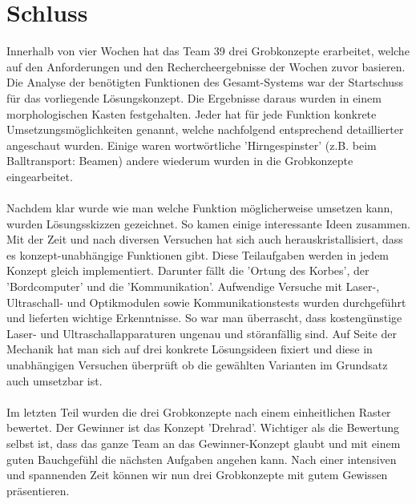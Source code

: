 \section{Schluss}
Innerhalb von vier Wochen hat das Team 39 drei Grobkonzepte erarbeitet, welche auf den Anforderungen und den Rechercheergebnisse der Wochen zuvor basieren. Die Analyse der benötigten Funktionen des Gesamt-Systems war der Startschuss für das vorliegende Lösungskonzept. Die Ergebnisse daraus wurden in einem morphologischen Kasten festgehalten. Jeder hat für jede Funktion konkrete Umsetzungsmöglichkeiten genannt, welche nachfolgend entsprechend detaillierter angeschaut wurden. Einige waren wortwörtliche 'Hirngespinster' (z.B. beim Balltransport: Beamen) andere wiederum wurden in die Grobkonzepte eingearbeitet. \\
\\
Nachdem klar wurde wie man welche Funktion möglicherweise umsetzen kann, wurden Lösungsskizzen gezeichnet. So kamen einige interessante Ideen zusammen. Mit der Zeit und nach diversen Versuchen hat sich auch herauskristallisiert, dass es konzept-unabhängige Funktionen gibt. Diese Teilaufgaben werden in jedem Konzept gleich implementiert. Darunter fällt die 'Ortung des Korbes', der 'Bordcomputer' und die 'Kommunikation'. Aufwendige Versuche mit Laser-, Ultraschall- und Optikmodulen sowie Kommunikationstests wurden durchgeführt und lieferten wichtige Erkenntnisse. So war man überrascht, dass kostengünstige Laser- und Ultraschallapparaturen ungenau und störanfällig sind. Auf Seite der Mechanik hat man sich auf drei konkrete Lösungsideen fixiert und diese in unabhängigen Versuchen überprüft ob die gewählten Varianten im Grundsatz auch umsetzbar ist.\\
\\
Im letzten Teil wurden die drei Grobkonzepte nach einem einheitlichen Raster bewertet. Der Gewinner ist das Konzept 'Drehrad'. Wichtiger als die Bewertung selbst ist, dass das ganze Team an das Gewinner-Konzept glaubt und mit einem guten Bauchgefühl die nächsten Aufgaben angehen kann. Nach einer intensiven und spannenden Zeit können wir nun drei Grobkonzepte mit gutem Gewissen präsentieren.